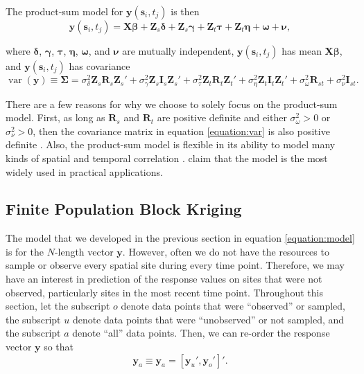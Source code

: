 \documentclass[]{interact}
\theoremstyle{plain}%
\theoremstyle{definition}
\theoremstyle{remark}
\begin{document}
The product-sum model for \(\mathbf{y}(\mathbf{s}_{i}, t_j)\) is then
\mbox{} \begin{equation} \label{equation:model}
\mathbf{y}(\mathbf{s}_{i}, t_j) = \mathbf{X} \bm{\beta} + \mathbf{Z}_{s} \bm{\delta} + \mathbf{Z}_{s} \bm{\gamma} + \mathbf{Z}_t \bm{\tau} + \mathbf{Z}_t \bm{\eta} + \bm{\omega} + \bm{\nu},
\end{equation}

\noindent where \(\bm{\delta}\), \(\bm{\gamma}\), \(\bm{\tau}\),
\(\bm{\eta}\), \(\bm{\omega}\), and \(\bm{\nu}\) are mutually
independent, \(\mathbf{y}(\mathbf{s}_{i}, t_j)\) has mean
\(\mathbf{X} \bm{\beta}\), and \(\mathbf{y}(\mathbf{s}_{i}, t_j)\) has
covariance \mbox{} \begin{equation}
\label{equation:var}
\mathop{\mathrm{{var}}}(\mathbf{y}) \equiv \bm{\Sigma} = \sigma^2_{\delta} \mathbf{Z}_{s} \mathbf{R}_{s} \mathbf{Z}_{s}' + \sigma^2_{\gamma} \mathbf{Z}_{s} \mathbf{I}_{s} \mathbf{Z}_{s}' + \sigma^2_{\tau} \mathbf{Z}_t \mathbf{R}_t \mathbf{Z}_t'+ \sigma^2_{\eta} \mathbf{Z}_t \mathbf{I}_t \mathbf{Z}_t' + \sigma^2_{\omega} \mathbf{R}_{st} + \sigma^2_{\nu} \mathbf{I}_{st}.
\end{equation}

\noindent There are a few reasons for why we choose to solely focus on
the product-sum model. First, as long as \(\mathbf{R}_s\) and
\(\mathbf{R}_t\) are positive definite and either
\(\sigma^2_{\omega} > 0\) or \(\sigma^2_{\nu} > 0\), then the covariance
matrix in equation \ref{equation:var} is also positive definite
\citep{de2001product, de2001space}. Also, the product-sum model is
flexible in its ability to model many kinds of spatial and temporal
correlation \citep{de2015spatio}. \citet{xu2015spatio} claim that the
model is the most widely used in practical applications.

\subsection{Finite Population Block Kriging} \label{subsection:fpbk}

The model that we developed in the previous section in equation
\ref{equation:model} is for the \(N\)-length vector \(\mathbf{y}\).
However, often we do not have the resources to sample or observe every
spatial site during every time point. Therefore, we may have an interest
in prediction of the response values on sites that were not observed,
particularly sites in the most recent time point. Throughout this
section, let the subscript \(o\) denote data points that were
``observed'' or sampled, the subscript \(u\) denote data points that
were ``unobserved'' or not sampled, and the subscript \(a\) denote
``all'' data points. Then, we can re-order the response vector
\(\mathbf{y}\) so that \mbox{} \begin{equation} \label{equation:ordered}
\mathbf{y}_a \equiv \mathbf{y}_a = [\mathbf{y}_u', \mathbf{y}_o']'.
\end{equation}
\end{document}
